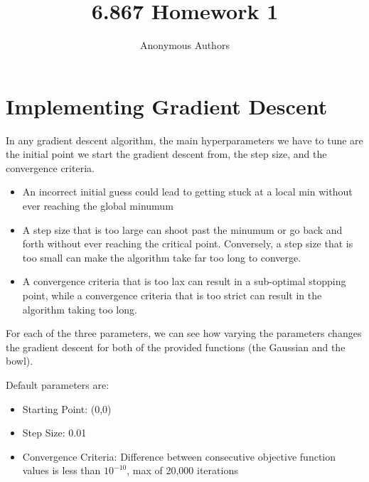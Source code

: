 \documentclass{article}
\title{6.867 Homework 1}
\author{Anonymous Authors}
\begin{document}
\maketitle
\thispagestyle{fancy}

\section{Implementing Gradient Descent}


In any gradient descent algorithm, the main hyperparameters we have to tune are the initial point we start the gradient descent from, the step size, and the convergence criteria. 

\begin{itemize}

\item An incorrect initial guess could lead to getting stuck at a local min without ever reaching the global minumum
\item A step size that is too large can shoot past the minumum or go back and forth without ever reaching the critical point. Conversely, a step size that is too small can make the algorithm take far too long to converge.
\item A convergence criteria that is too lax can result in a sub-optimal stopping point, while a convergence criteria that is too strict can result in the algorithm taking too long.

\end{itemize}

For each of the three parameters, we can see how varying the parameters changes the gradient descent for both of the provided functions (the Gaussian and the bowl).

Default parameters are: 

\begin{itemize}

\item Starting Point: (0,0)
\item Step Size: 0.01
\item Convergence Criteria: Difference between consecutive objective function values is less than $10^{-10}$, max of 20,000 iterations
\end{itemize}
\end{document}
